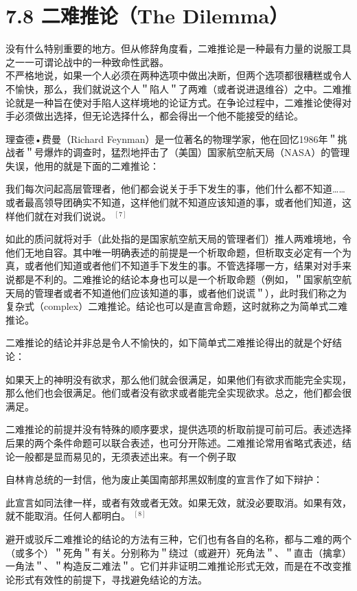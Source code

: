 \section*{7.8 二难推论（The Dilemma）}
没有什么特别重要的地方。但从修辞角度看，二难推论是一种最有力量的说服工具之一一可谓论战中的一种致命性武器。\\
不严格地说，如果一个人必须在两种选项中做出决断，但两个选项都很糟糕或令人不愉快，那么，我们就说这个人＂陷人＂了两难（或者说进退维谷）之中。二难推论就是一种旨在使对手陷人这样境地的论证方式。在争论过程中，二难推论使得对手必须做出选择，但无论选择什么，都会得出一个他不能接受的结论。

理查德•费曼（Richard Feynman）是一位著名的物理学家，他在回忆1986年＂挑战者＂号爆炸的调查时，猛烈地抨击了（美国）国家航空航天局（NASA）的管理失误，他用的就是下面的二难推论：

\begin{displayquote}
我们每次问起高层管理者，他们都会说关于手下发生的事，他们什么都不知道……或者最高领导团确实不知道，这样他们就不知道应该知道的事，或者他们知道，这样他们就在对我们说说。 ${ }^{[7]}$
\end{displayquote}

如此的质问就将对手（此处指的是国家航空航天局的管理者们）推人两难境地，令他们无地自容。其中唯一明确表述的前提是一个析取命题，但析取支必定有一个为真，或者他们知道或者他们不知道手下发生的事。不管选择哪一方，结果对对手来说都是不利的。二难推论的结论本身也可以是一个析取命题（例如，＂国家航空航天局的管理者或者不知道他们应该知道的事，或者他们说谎＂），此时我们称之为复杂式（complex）二难推论。结论也可以是直言命题，这时就称之为简单式二难推论。

二难推论的结论并非总是令人不愉快的，如下简单式二难推论得出的就是个好结论：

如果天上的神明没有欲求，那么他们就会很满足，如果他们有欲求而能完全实现，那么他们也会很满足。他们或者没有欲求或者能完全实现欲求。总之，他们都会很满足。

二难推论的前提并没有特殊的顺序要求，提供选项的析取前提可前可后。表述选择后果的两个条件命题可以联合表述，也可分开陈述。二难推论常用省略式表述，结论一般都是显而易见的，无须表述出来。有一个例子取

自林肯总统的一封信，他为废止美国南部邦黑奴制度的宣言作了如下辩护：

此宣言如同法律一样，或者有效或者无效。如果无效，就没必要取消。如果有效，就不能取消。任何人都明白。 ${ }^{[8]}$

避开或驳斥二难推论的结论的方法有三种，它们也有各自的名称，都与二难的两个（或多个）＂死角＂有关。分别称为＂绕过（或避开）死角法＂、＂直击（擒拿）一角法＂、＂构造反二难法＂。它们并非证明二难推论形式无效，而是在不改变推论形式有效性的前提下，寻找避免结论的方法。

